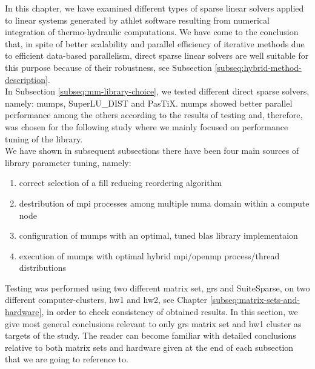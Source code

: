 \label{subseq:mm-conclusion}

In this chapter, we have examined different types of sparse linear solvers applied to linear systems generated by \acrshort{athlet} software resulting from numerical integration of thermo-hydraulic computations. We have come to the conclusion that, in spite of better scalability and parallel efficiency of iterative methods due to efficient data-based parallelism, direct sparse linear solvers are well suitable for this purpose because of their robustness, see Subsection \ref{subseq:hybrid-method-description}.\\


In Subsection \ref{subseq:mm-library-choice}, we tested different direct sparse solvers, namely: \acrshort{mumps},  SuperLU\_DIST and PasTiX. \acrshort{mumps} showed better parallel performance among the others according to  the results of testing and, therefore, was chosen for the following study where we mainly focused on performance tuning of the library.\\


We have shown in subsequent subsections there have been four main sources of library parameter tuning, namely:

\begin{enumerate}
	\item correct selection of a fill reducing reordering algorithm \label{conclusion:mm-1}
	\item destribution of \acrshort{mpi} processes among multiple \acrshort{numa} domain within a compute node \label{conclusion:mm-2}
	\item configuration of \acrshort{mumps} with an optimal, tuned \acrshort{blas} library implementaion \label{conclusion:mm-3}
	\item execution of \acrshort{mumps} with optimal hybrid \acrshort{mpi}/\acrshort{openmp} process/thread distributions \label{conclusion:mm-4}
\end{enumerate}


Testing was performed using two different matrix set, \acrshort{grs} and SuiteSparse, on two different computer-clusters, \gls{hw1} and \gls{hw2}, see Chapter \ref{subseq:matrix-sets-and-hardware}, in order to check consistency of obtained results. In this section, we  give most general conclusions relevant to only \acrshort{grs} matrix set and \gls{hw1} cluster as targets of the study. The reader can become familiar with detailed conclusions relative to both matrix sets and hardware given at the end of each subsection that we are going to reference to.\\



